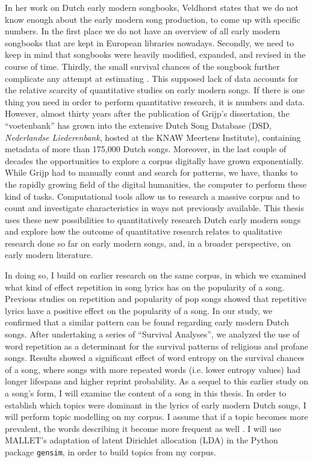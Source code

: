 In her work on Dutch early modern songbooks, Veldhorst states that we do not know enough about the early modern song production, to come up with specific numbers. In the first place we do not have an overview of all early modern songbooks that are kept in European libraries nowadays. Secondly, we need to keep in mind that songbooks were heavily modified, expanded, and revised in the course of time. Thirdly, the small survival chances of the songbook further complicate any attempt at estimating \autocite[225-227]{veldhorst_pharmacy_2008}. This supposed lack of data accounts for the relative scarcity of quantitative studies on early modern songs. If there is one thing you need in order to perform quantitative research, it is numbers and data. However, almost thirty years after the publication of Grijp's dissertation, the \enquote{voetenbank} has grown into the extensive Dutch Song Database (DSD, \textit{Nederlandse Liederenbank}, hosted at the KNAW Meertens Institute), containing metadata of more than 175,000 Dutch songs. Moreover, in the last couple of decades the opportunities to explore a corpus digitally have grown exponentially. While Grijp had to manually count and search for patterns, we have, thanks to the rapidly growing field of the digital humanities, the computer to perform these kind of tasks. Computational tools allow us to research a massive corpus and to count and investigate characteristics in ways not previously available. This thesis uses these new possibilities to quantitatively research Dutch early modern songs and explore how the outcome of quantitative research relates to qualitative research done so far on early modern songs, and, in a broader perspective, on early modern literature.

In doing so, I build on earlier research on the same corpus, in which we examined what kind of effect repetition in song lyrics has on the popularity of a song. Previous studies on repetition and popularity of pop songs showed that repetitive lyrics have a positive effect on the popularity of a song. \autocites{nunes_power_2015}{alexander_entropy_1996} In our study, we confirmed that a similar pattern can be found regarding early modern Dutch songs. After undertaking a series of \enquote{Survival Analyses}, we analyzed the use of word repetition as a determinant for the survival patterns of religious and profane songs. Results showed a significant effect of word entropy on the survival chances of a song, where songs with more repeated words (i.e. lower entropy values) had longer lifespans and higher reprint probability.\autocite{lassche_repetition_2019} As a sequel to this earlier study on a song's form, I will examine the content of a song in this thesis. In order to establish which topics were dominant in the lyrics of early modern Dutch songs, I will perform topic modelling on my corpus. I assume that if a topic becomes more prevalent, the words describing it become more frequent as well \autocite[6]{karjus_quantifying_2018}. I will use MALLET's adaptation of latent Dirichlet allocation (LDA) in the Python package \texttt{gensim}, in order to build topics from my corpus.

